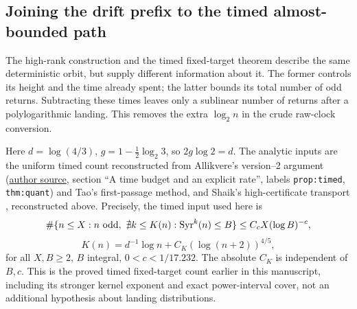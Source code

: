\documentclass[11pt]{article}
\theoremstyle{remark}\newtheorem{remark}[proposition]{Remark}
\newcommand{\Syr}{\operatorname{Syr}}
\begin{document}
\subsection{Joining the drift prefix to the timed almost-bounded path}
\label{subsec:shaik-allikvere-splice}

The high-rank construction and the timed fixed-target theorem describe
the same deterministic orbit, but supply different information about it.
The former controls its height and the time already spent; the latter
bounds its total number of odd returns. Subtracting these times leaves
only a sublinear number of returns after a polylogarithmic landing.
This removes the extra \(\log_2 n\) in the crude raw-clock conversion.

Here \(d=\log(4/3)\), \(g=1-\tfrac12\log_2 3\), so \(2g\log2=d\).
The analytic inputs are the uniform timed count reconstructed from
Allikvere's version--2 argument
(\href{https://doi.org/10.5281/zenodo.21499244}{author source},
section ``A time budget and an explicit rate'', labels
\texttt{prop:timed}, \texttt{thm:quant}) and Tao's first-passage method, and Shaik's
high-certificate transport \cite{Shaik2026v324}, reconstructed above.
Precisely, the timed input used here is
\[
 \#\{n\le X:n\ {\rm odd},\
       \nexists k\le K(n):\Syr^k(n)\le B\}
 \le C_c X(\log B)^{-c},
\]
\[
 K(n)=d^{-1}\log n+C_K(\log(n+2))^{4/5},
\]
for all \(X,B\ge2\), \(B\) integral, \(0<c<1/17.232\).
The absolute \(C_K\) is independent of \(B,c\).
This is the proved timed fixed-target count earlier in this manuscript,
including its stronger kernel exponent and exact power-interval cover,
not an additional hypothesis about landing distributions.
\end{document}
